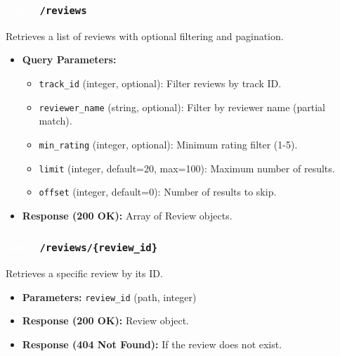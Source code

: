 \documentclass[11pt,a4paper]{article}
\newcommand{\methodGET}{\colorbox{getcolor}{\textcolor{white}{\textbf{GET}}}}
\begin{document}
\subsubsection*{\methodGET \texttt{ /reviews}}
Retrieves a list of reviews with optional filtering and pagination.
\begin{itemize}[label=\textcolor{primary}{\textbullet}, noitemsep]
    \item \textbf{Query Parameters:}
    \begin{itemize}[label=--, noitemsep]
        \item \texttt{track\_id} (integer, optional): Filter reviews by track ID.
        \item \texttt{reviewer\_name} (string, optional): Filter by reviewer name (partial match).
        \item \texttt{min\_rating} (integer, optional): Minimum rating filter (1-5).
        \item \texttt{limit} (integer, default=20, max=100): Maximum number of results.
        \item \texttt{offset} (integer, default=0): Number of results to skip.
    \end{itemize}
    \item \textbf{Response (200 OK):} Array of Review objects.
\end{itemize}

\subsubsection*{\methodGET \texttt{ /reviews/\{review\_id\}}}
Retrieves a specific review by its ID.
\begin{itemize}[label=\textcolor{primary}{\textbullet}, noitemsep]
    \item \textbf{Parameters:} \texttt{review\_id} (path, integer)
    \item \textbf{Response (200 OK):} Review object.
    \item \textbf{Response (404 Not Found):} If the review does not exist.
\end{itemize}
\end{document}
